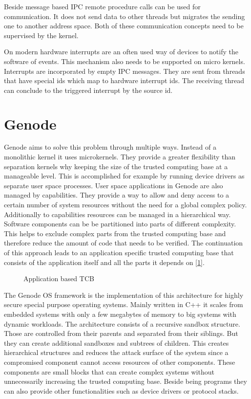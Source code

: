 \documentclass[
a4paper,
12pt,
notitlepage,
parskip=half,
DIV=11,
]{scrbook}
\begin{document}
		Beside message based IPC remote procedure calls can be used for communication.
		It does not send data to other threads but migrates the sending one to another address space.
		Both of these communication concepts need to be supervised by the kernel.
		
		On modern hardware interrupts are an often used way of devices to notify the software of events.
		This mechanism also needs to be supported on micro kernels.
		Interrupts are incorporated by empty IPC messages.
		They are sent from threads that have special ids which map to hardware interrupt ids.
		The receiving thread can conclude to the triggered interrupt by the source id. \citep{Liedtke_1995}
		
		\section{Genode}
		
		Genode aims to solve this problem through multiple ways.
		Instead of a monolithic kernel it uses microkernels.
		They provide a greater flexibility than separation kernels why keeping the size of the trusted computing base at a manageable level.
		This is accomplished for example by running device drivers as separate user space processes.
		User space applications in Genode are also managed by capabilities.
		They provide a way to allow and deny access to a certain number of system resources without the need for a global complex policy.
		Additionally to capabilities resources can be managed in a hierarchical way.
		Software components can be be partitioned into parts of different complexity.
		This helps to exclude complex parts from the trusted computing base and therefore reduce the amount of code that needs to be verified.
		The continuation of this approach leads to an application specific trusted computing base that consists of the application itself and all the parts it depends on [\ref{fig:tcb_tree}].
		\citep{genode}
		
		\begin{figure}
			\centering
			
			\caption{Application based TCB \citep{genode}}
			\label{fig:tcb_tree}
		\end{figure}
		
		The Genode OS framework is the implementation of this architecture for highly secure special purpose operating systems.
		Mainly written in C++ it scales from embedded systems with only a few megabytes of memory to big systems with dynamic workloads.
		The architecture consists of a recursive sandbox structure.
		Those are controlled from their parents and separated from their siblings.
		But they can create additional sandboxes and subtrees of children.
		This creates hierarchical structures and reduces the attack surface of the system since a compromised component cannot access resources of other components.
		These components are small blocks that can create complex systems without unnecessarily increasing the trusted computing base.
		Beside being programs they can also provide other functionalities such as device drivers or protocol stacks.
		
\end{document}
